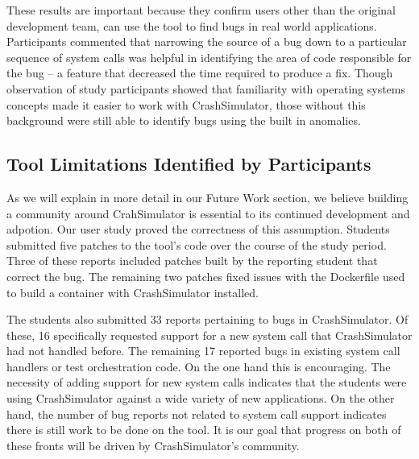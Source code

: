 These results are important
because they confirm
users other than the original development team,
can use the tool to find bugs in real world applications.
Participants commented that narrowing the source of a bug
down to a particular sequence of system calls
was helpful in identifying the area of
code responsible for the bug -- a feature
that decreased the time required to produce a fix.
Though observation of study participants
showed that familiarity with operating systems concepts
made it easier to work with CrashSimulator,
those without this background were still able to identify bugs using the
built in anomalies.

\subsection{Tool Limitations Identified by Participants}
\label{subsec:crashsim-patches}

As we will explain in more detail in our Future Work section,
we believe building a community around CrahSimulator is essential to its
continued development and adpotion.  Our user study proved the correctness
of this assumption.
Students submitted five patches
to the tool's code over the
course of the study period.
Three of these reports included patches built by the reporting student that
correct the bug.
The remaining two patches fixed issues with the
Dockerfile used to build a container with CrashSimulator installed.

The students also submitted 33 reports pertaining to bugs in CrashSimulator.
Of these, 16 specifically requested support for a new system call that
CrashSimulator had not handled before.  The remaining 17 reported bugs in
existing system call handlers or test orchestration code.
On the one hand this is encouraging.  The necessity of adding
support for new system calls
indicates that the students were
using CrashSimulator against a wide variety of new applications.
On the other hand, the number of bug reports not related to system call support
indicates there is still work to be done on the tool.
It is our goal that progress on both of these fronts will be driven by
CrashSimulator's community.

